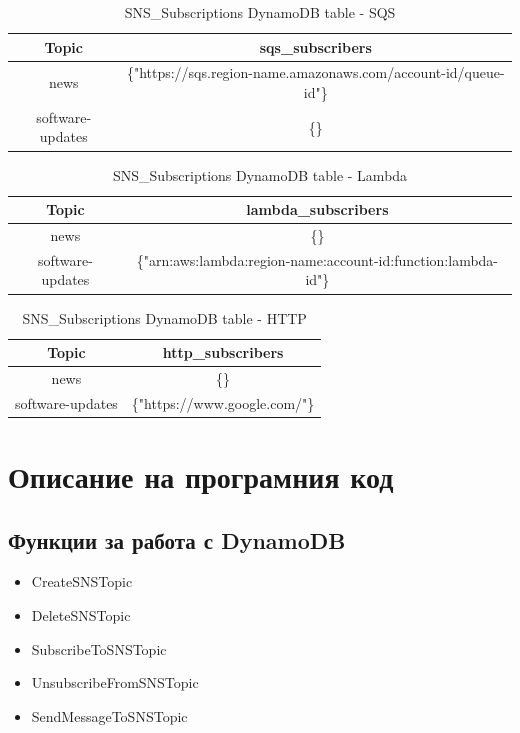 \documentclass[12pt]{article}
\begin{document}
\begin{table}
\caption{SNS\_Subscriptions DynamoDB table - SQS}
\center
\begin{tabular}{ |c|c| }
 \hline
 Topic & sqs\_subscribers \\ \hline

 news & \{"https://sqs.region-name.amazonaws.com/account-id/queue-id"\} \\
 software-updates & \{\} \\ 
 \hline
\end{tabular}
\end{table}

\begin{table}
\caption{SNS\_Subscriptions DynamoDB table - Lambda}
\center
\begin{tabular}{ |c|c| }
 \hline
 Topic & lambda\_subscribers \\ \hline

 news & \{\} \\
 software-updates & \{"arn:aws:lambda:region-name:account-id:function:lambda-id"\} \\ 
 \hline
\end{tabular}
\end{table}

\begin{table}
\caption{SNS\_Subscriptions DynamoDB table - HTTP}
\center
\begin{tabular}{ |c|c| }
 \hline
 Topic & http\_subscribers \\ \hline

 news & \{\} \\
 software-updates & \{"https://www.google.com/"\} \\  
 \hline
\end{tabular}
\end{table}

 
\section{Описание на програмния код}

\subsection{Функции за работа с DynamoDB}
\begin{itemize}
  \item CreateSNSTopic
  \item DeleteSNSTopic
  \item SubscribeToSNSTopic
  \item UnsubscribeFromSNSTopic
  \item SendMessageToSNSTopic
\end{itemize}
\end{document}
